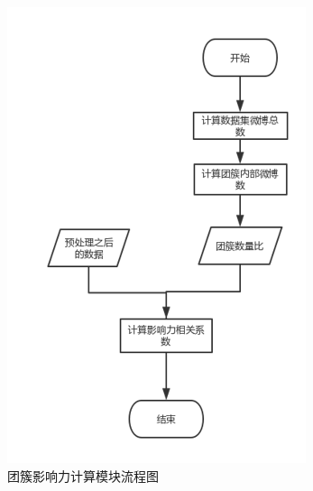 \begin{figure}[h]
	\centering
	\includegraphics[scale=0.5]{figures/7.png}
	\caption{团簇影响力计算模块流程图}
	\label{fig:1}
\end{figure}

